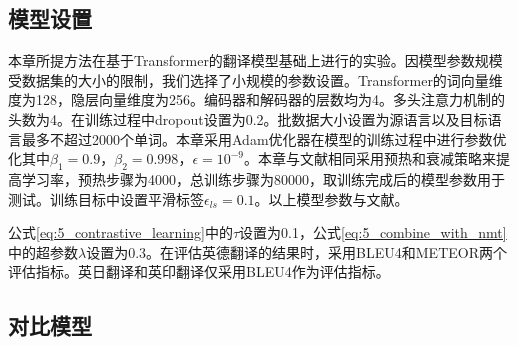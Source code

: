 \subsection{模型设置}
\label{sec:5_model_setup}

本章所提方法在基于Transformer的翻译模型基础上进行的实验。因模型参数规模受数据集的大小的限制，我们选择了小规模的参数设置。Transformer的词向量维度为128，隐层向量维度为256。编码器和解码器的层数均为4。多头注意力机制的头数为4。在训练过程中dropout设置为0.2。批数据大小设置为源语言以及目标语言最多不超过2000个单词。本章采用Adam优化器在模型的训练过程中进行参数优化其中$\beta_1=0.9$，$\beta_2=0.998$，$\epsilon=10^{-9}$。本章与文献\cite{5_DBLP:journals/corr/VaswaniSPUJGKP17}相同采用预热和衰减策略来提高学习率，预热步骤为4000，总训练步骤为80000，取训练完成后的模型参数用于测试。训练目标中设置平滑标签$\epsilon_{ls}=0.1$。以上模型参数与文献\cite{33_yin-etal-2020-novel}。

公式\ref{eq:5_contrastive_learning}中的$\tau$设置为0.1，公式\ref{eq:5_combine_with_nmt}中的超参数$\lambda$设置为0.3。在评估英德翻译的结果时，采用BLEU4\cite{42_papineni-etal-2002-bleu}和METEOR\cite{46_denkowski-lavie-2014-meteor}两个评估指标。英日翻译和英印翻译仅采用BLEU4作为评估指标。

\subsection{对比模型}

